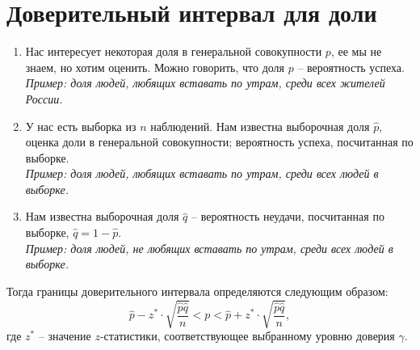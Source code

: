 \documentclass[a4paper,12pt]{extarticle}
\begin{document}
\section*{Доверительный интервал для доли}
\begin{enumerate}
\item Нас интересует некоторая доля в генеральной совокупности $p$, 
ее мы не знаем, но хотим оценить. Можно говорить, что доля $p$ 
-- вероятность успеха. \medskip\\
\textit{Пример: доля людей, любящих вставать по утрам, среди 
всех жителей России.}
\item У нас есть выборка из $n$ наблюдений. Нам известна 
выборочная доля $\hat{p}$, оценка доли в генеральной 
совокупности; вероятность успеха, посчитанная по выборке.\medskip\\
\textit{Пример: доля людей, любящих вставать по утрам, 
среди всех людей в выборке.}
\item Нам известна выборочная доля $\hat{q}$ -- вероятность 
неудачи, посчитанная по выборке, $\hat{q}=1-\hat{p}$.\medskip\\
\textit{Пример: доля людей, не любящих вставать по утрам, 
среди всех людей в выборке.}
\end{enumerate}
Тогда границы доверительного интервала определяются следующим образом:
$$
\hat{p} - z^* \cdot \sqrt{\frac{\hat{p}\hat{q}}{n}}<p< \hat{p} + z^* \cdot \sqrt{\frac{\hat{p}\hat{q}}{n}},
$$
где $z^*$ -- значение $z$-статистики, соответствующее 
выбранному уровню доверия $\gamma$. 
\end{document}
